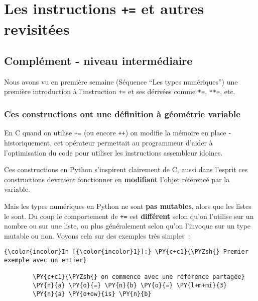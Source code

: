     
    
    
    

    

    \hypertarget{les-instructions-et-autres-revisituxe9es}{%
\section{\texorpdfstring{Les instructions \texttt{+=} et autres
revisitées}{Les instructions += et autres revisitées}}\label{les-instructions-et-autres-revisituxe9es}}

    \hypertarget{compluxe9ment---niveau-intermuxe9diaire}{%
\subsection{Complément - niveau
intermédiaire}\label{compluxe9ment---niveau-intermuxe9diaire}}

    Nous avons vu en première semaine (Séquence ``Les types numériques'')
une première introduction à l'instruction \texttt{+=} et ses dérivées
comme \texttt{*=}, \texttt{**=}, etc.

    \hypertarget{ces-constructions-ont-une-duxe9finition-uxe0-guxe9omuxe9trie-variable}{%
\subsubsection{Ces constructions ont une définition à géométrie
variable}\label{ces-constructions-ont-une-duxe9finition-uxe0-guxe9omuxe9trie-variable}}

    En C quand on utilise \texttt{+=} (ou encore \texttt{++}) on modifie la
mémoire en place - historiquement, cet opérateur permettait au
programmeur d'aider à l'optimisation du code pour utiliser les
instructions assembleur idoines.

Ces constructions en Python s'inspirent clairement de C, aussi dans
l'esprit ces constructions devraient fonctionner en \textbf{modifiant}
l'objet référencé par la variable.

Mais les types numériques en Python ne sont \textbf{pas mutables}, alors
que les listes le sont. Du coup le comportement de \texttt{+=} est
\textbf{différent} selon qu'on l'utilise sur un nombre ou sur une liste,
ou plus généralement selon qu'on l'invoque sur un type mutable ou non.
Voyons cela sur des exemples très simples~:

    \begin{Verbatim}[commandchars=\\\{\}]
{\color{incolor}In [{\color{incolor}1}]:} \PY{c+c1}{\PYZsh{} Premier exemple avec un entier}
        
        \PY{c+c1}{\PYZsh{} on commence avec une référence partagée}
        \PY{n}{a} \PY{o}{=} \PY{n}{b} \PY{o}{=} \PY{l+m+mi}{3}
        \PY{n}{a} \PY{o+ow}{is} \PY{n}{b}
\end{Verbatim}


